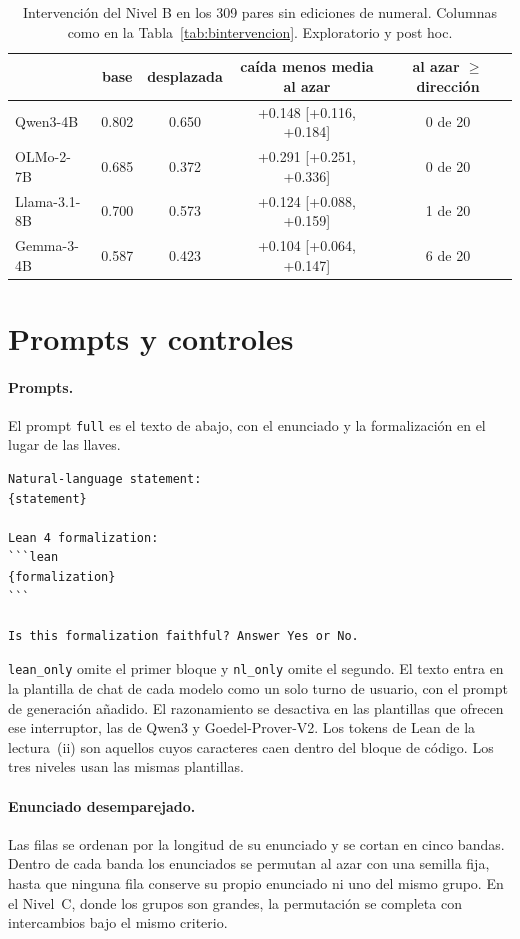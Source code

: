 \documentclass[10pt]{article}
\newcommand{\vr}[1]{\texttt{#1}}
\begin{document}
\begin{table}[h]
\centering
\caption{Intervención del Nivel B en los 309 pares sin ediciones de numeral. Columnas como en la Tabla~\ref{tab:bintervencion}. Exploratorio y post hoc.}
\label{tab:bsinc2}
\vspace{2pt}
{\footnotesize
\begin{tabular}{@{}lcccc@{}}
\toprule
 & base & desplazada & caída menos media al azar & al azar $\geq$ dirección\\
\midrule
Qwen3-4B     & 0.802 & 0.650 & +0.148 [+0.116, +0.184] & 0 de 20\\
OLMo-2-7B    & 0.685 & 0.372 & +0.291 [+0.251, +0.336] & 0 de 20\\
Llama-3.1-8B & 0.700 & 0.573 & +0.124 [+0.088, +0.159] & 1 de 20\\
Gemma-3-4B   & 0.587 & 0.423 & +0.104 [+0.064, +0.147] & 6 de 20\\
\bottomrule
\end{tabular}}
\end{table}

\section{Prompts y controles}\label{app:definiciones}

\paragraph{Prompts.} El prompt \vr{full} es el texto de abajo, con el enunciado y la formalización en el lugar de las
llaves.
\begin{verbatim}
Natural-language statement:
{statement}

Lean 4 formalization:
```lean
{formalization}
```

Is this formalization faithful? Answer Yes or No.
\end{verbatim}
\vr{lean\_only} omite el primer bloque y \vr{nl\_only} omite el segundo. El texto entra en la plantilla de chat de
cada modelo como un solo turno de usuario, con el prompt de generación añadido. El razonamiento se desactiva en las
plantillas que ofrecen ese interruptor, las de Qwen3 y Goedel-Prover-V2. Los tokens de Lean de la lectura~(ii) son
aquellos cuyos caracteres caen dentro del bloque de código. Los tres niveles usan las mismas plantillas.

\paragraph{Enunciado desemparejado.} Las filas se ordenan por la longitud de su enunciado y se cortan en cinco bandas.
Dentro de cada banda los enunciados se permutan al azar con una semilla fija, hasta que ninguna fila conserve su
propio enunciado ni uno del mismo grupo. En el Nivel~C, donde los grupos son grandes, la permutación se completa con
intercambios bajo el mismo criterio.
\end{document}
